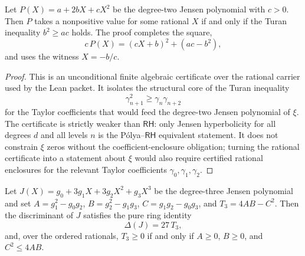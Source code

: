 \begin{theorem}
\label{thm:rh-jensen-turan-degree2}
Let $P(X)=a+2bX+cX^{2}$ be the degree-two Jensen polynomial with
$c>0$.  Then $P$ takes a nonpositive value for some rational $X$ if and
only if the Turan inequality $b^{2}\ge ac$ holds.  The proof completes
the square,
$$
c\,P(X)=(cX+b)^{2}+(ac-b^{2}),
$$
and uses the witness $X=-b/c$.
\end{theorem}

\begin{proof}
This is an unconditional finite algebraic certificate over the rational
carrier used by the Lean packet.  It isolates the structural core of the
Turan inequality
$$
\gamma_{n+1}^{2}\ge \gamma_n\gamma_{n+2}
$$
for the Taylor coefficients that would feed the degree-two Jensen
polynomial of $\xi$.  The certificate is strictly weaker than
$\mathsf{RH}$: only Jensen hyperbolicity for all degrees $d$ and all
levels $n$ is the P\'olya--$\mathsf{RH}$ equivalent statement.  It does
not constrain $\xi$ zeros without the coefficient-enclosure obligation;
turning the rational certificate into a statement about $\xi$ would also
require certified rational enclosures for the relevant Taylor
coefficients $\gamma_0,\gamma_1,\gamma_2$.
\end{proof}

\begin{theorem}
\label{thm:rh-jensen-turan-degree3}
Let $J(X)=g_0+3g_1X+3g_2X^2+g_3X^3$ be the degree-three Jensen
polynomial and set $A=g_1^2-g_0g_2$, $B=g_2^2-g_1g_3$,
$C=g_1g_2-g_0g_3$, and $T_3=4AB-C^2$.  Then the discriminant of $J$
satisfies the pure ring identity
$$
\Delta(J)=27\,T_3,
$$
and, over the ordered rationals, $T_3\ge 0$ if and only if $A\ge 0$,
$B\ge 0$, and $C^2\le 4AB$.
\end{theorem}

